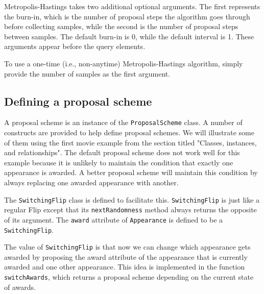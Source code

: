 Metropolis-Hastings takes two additional optional arguments. The first represents the burn-in, which is the number of proposal steps the algorithm goes through before collecting samples, while the second is the number of proposal steps between samples. The default burn-in is 0, while the default interval is 1. These arguments appear before the query elements.

To use a one-time (i.e., non-anytime) Metropolis-Hastings algorithm, simply provide the number of samples as the first argument.

\subsection{Defining a proposal scheme}

A proposal scheme is an instance of the \texttt{ProposalScheme} class. A number of constructs are provided to help define proposal schemes. We will illustrate some of them using the first movie example from the section titled "Classes, instances, and relationships". The default proposal scheme does not work well for this example because it is unlikely to maintain the condition that exactly one appearance is awarded. A better proposal scheme will maintain this condition by always replacing one awarded appearance with another.

The \texttt{SwitchingFlip} class is defined to facilitate this. \texttt{SwitchingFlip} is just like a regular Flip except that its \texttt{nextRandomness} method always returns the opposite of its argument. The \texttt{award} attribute of \texttt{Appearance} is defined to be a \texttt{SwitchingFlip}. 

The value of \texttt{SwitchingFlip} is that now we can change which appearance gets awarded by proposing the award attribute of the appearance that is currently awarded and one other appearance. This idea is implemented in the function \texttt{switchAwards}, which returns a proposal scheme depending on the current state of awards.

